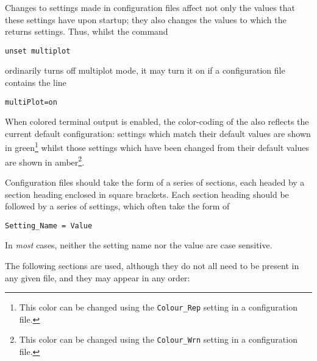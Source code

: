 Changes to settings made in configuration files affect not only the values that
these settings have upon startup; they also changes the values to which the
 returns settings. Thus, whilst the command
\begin{verbatim}
unset multiplot
\end{verbatim}
ordinarily turns off multiplot mode, it may turn it on if a configuration file
contains the line
\begin{verbatim}
multiPlot=on
\end{verbatim}
When colored terminal output is enabled, the color-coding of the
 also reflects the current default configuration: settings which
match their default values are shown in green\footnote{This color can be
changed using the {\tt Colour\_Rep} setting in a configuration file.} whilst
those settings which have been changed from their default values are shown in
amber\footnote{This color can be changed using the {\tt Colour\_Wrn} setting
in a configuration file.}.

Configuration files should take the form of a series of sections, each headed
by a section heading enclosed in square brackets. Each section heading should
be followed by a series of settings, which often take the form of
\begin{verbatim}
Setting_Name = Value
\end{verbatim}
In {\it most} cases, neither the setting name nor the value are case sensitive.

The following sections are used, although they do not all need to be present in
any given file, and they may appear in any order:

